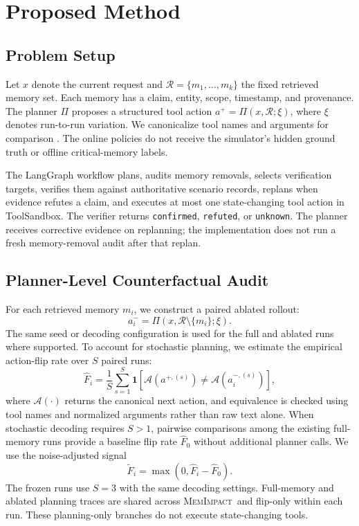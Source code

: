 \documentclass[11pt]{article}
\newcommand{\method}{\textsc{MemImpact}}
\newcommand{\R}{\mathcal{R}}
\newcommand{\A}{\mathcal{A}}
\begin{document}
\section{Proposed Method}

\subsection{Problem Setup}

Let $x$ denote the current request and $\R=\{m_1,\ldots,m_k\}$ the fixed retrieved memory set. Each memory has a claim, entity, scope, timestamp, and provenance. The planner $\Pi$ proposes a structured tool action $a^{+}=\Pi(x,\R;\xi)$, where $\xi$ denotes run-to-run variation. We canonicalize tool names and arguments for comparison \cite{yao2023react}. The online policies do not receive the simulator's hidden ground truth or offline critical-memory labels.

The LangGraph workflow plans, audits memory removals, selects verification targets, verifies them against authoritative scenario records, replans when evidence refutes a claim, and executes at most one state-changing tool action in ToolSandbox. The verifier returns \texttt{confirmed}, \texttt{refuted}, or \texttt{unknown}. The planner receives corrective evidence on replanning; the implementation does not run a fresh memory-removal audit after that replan.

\subsection{Planner-Level Counterfactual Audit}

For each retrieved memory $m_i$, we construct a paired ablated rollout:
\begin{equation}
  a_i^{-}=\Pi\!\left(x,\R\setminus\{m_i\};\xi\right).
\end{equation}
The same seed or decoding configuration is used for the full and ablated runs where supported. To account for stochastic planning, we estimate the empirical action-flip rate over $S$ paired runs:
\begin{equation}
  \widehat{F}_i=\frac{1}{S}\sum_{s=1}^{S}
  \mathbf{1}\!\left[\A\!\left(a^{+,(s)}\right)\neq
  \A\!\left(a_i^{-,(s)}\right)\right],
\end{equation}
where $\A(\cdot)$ returns the canonical next action, and equivalence is checked using tool names and normalized arguments rather than raw text alone. When stochastic decoding requires $S>1$, pairwise comparisons among the existing full-memory runs provide a baseline flip rate $\widehat{F}_0$ without additional planner calls. We use the noise-adjusted signal
\begin{equation}
  \widetilde{F}_i=\max\left(0,\widehat{F}_i-\widehat{F}_0\right).
\end{equation}
The frozen runs use $S=3$ with the same decoding settings. Full-memory and ablated planning traces are shared across \method\ and flip-only within each run. These planning-only branches do not execute state-changing tools.
\end{document}
